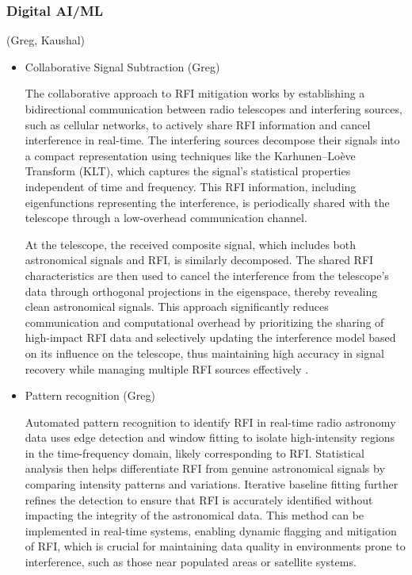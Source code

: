 \subsubsection{Digital AI/ML} (Greg, Kaushal)
\begin{itemize}
\item Collaborative Signal Subtraction (Greg)

The collaborative approach to RFI mitigation works by establishing a bidirectional communication between radio telescopes and interfering sources, such as cellular networks, to actively share RFI information and cancel interference in real-time. The interfering sources decompose their signals into a compact representation using techniques like the Karhunen–Loève Transform (KLT), which captures the signal's statistical properties independent of time and frequency. This RFI information, including eigenfunctions representing the interference, is periodically shared with the telescope through a low-overhead communication channel.

At the telescope, the received composite signal, which includes both astronomical signals and RFI, is similarly decomposed. The shared RFI characteristics are then used to cancel the interference from the telescope’s data through orthogonal projections in the eigenspace, thereby revealing clean astronomical signals. This approach significantly reduces communication and computational overhead by prioritizing the sharing of high-impact RFI data and selectively updating the interference model based on its influence on the telescope, thus maintaining high accuracy in signal recovery while managing multiple RFI sources effectively \cite{chakraborty2023collaboration,chakraborty2024low}.

\item Pattern recognition (Greg)

Automated pattern recognition to identify RFI in real-time radio astronomy data \cite{Winkel_2007} uses edge detection and window fitting to isolate high-intensity regions in the time-frequency domain, likely corresponding to RFI. Statistical analysis then helps differentiate RFI from genuine astronomical signals by comparing intensity patterns and variations. Iterative baseline fitting further refines the detection to ensure that RFI is accurately identified without impacting the integrity of the astronomical data. This method can be implemented in real-time systems, enabling dynamic flagging and mitigation of RFI, which is crucial for maintaining data quality in environments prone to interference, such as those near populated areas or satellite systems.


\end{itemize}
